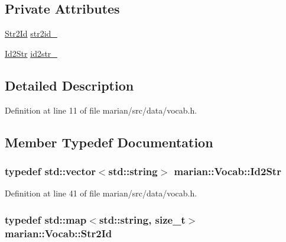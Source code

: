 \subsection*{Private Attributes}
\begin{DoxyCompactItemize}
\item 
\hyperlink{classmarian_1_1Vocab_a3ff740ce19200167d306de3643bd49e3}{Str2\+Id} \hyperlink{classmarian_1_1Vocab_ab79ee07a9432b1273fc4c92ea7390739}{str2id\+\_\+}
\item 
\hyperlink{classmarian_1_1Vocab_a9208af73b752aeed1ce03ae5c429d897}{Id2\+Str} \hyperlink{classmarian_1_1Vocab_a9ec3e11b136d7d75d8647471c28a5fac}{id2str\+\_\+}
\end{DoxyCompactItemize}


\subsection{Detailed Description}


Definition at line 11 of file marian/src/data/vocab.\+h.



\subsection{Member Typedef Documentation}
\subsubsection[{\texorpdfstring{Id2\+Str}{Id2Str}}]{\setlength{\rightskip}{0pt plus 5cm}typedef std\+::vector$<$std\+::string$>$ {\bf marian\+::\+Vocab\+::\+Id2\+Str}\hspace{0.3cm}{\ttfamily [private]}}\hypertarget{classmarian_1_1Vocab_a9208af73b752aeed1ce03ae5c429d897}{}\label{classmarian_1_1Vocab_a9208af73b752aeed1ce03ae5c429d897}


Definition at line 41 of file marian/src/data/vocab.\+h.

\subsubsection[{\texorpdfstring{Str2\+Id}{Str2Id}}]{\setlength{\rightskip}{0pt plus 5cm}typedef std\+::map$<$std\+::string, size\+\_\+t$>$ {\bf marian\+::\+Vocab\+::\+Str2\+Id}\hspace{0.3cm}{\ttfamily [private]}}\hypertarget{classmarian_1_1Vocab_a3ff740ce19200167d306de3643bd49e3}{}\label{classmarian_1_1Vocab_a3ff740ce19200167d306de3643bd49e3}


